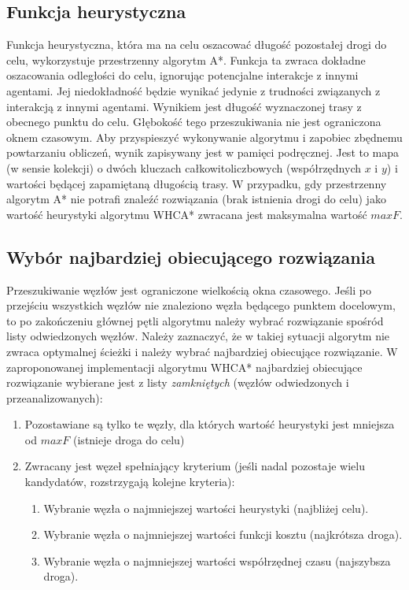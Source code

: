 \subsection{Funkcja heurystyczna}
Funkcja heurystyczna, która ma na celu oszacować długość pozostałej drogi do celu, wykorzystuje przestrzenny algorytm A*.
Funkcja ta zwraca dokładne oszacowania odległości do celu, ignorując potencjalne interakcje z innymi agentami. Jej niedokładność będzie wynikać jedynie z trudności związanych z interakcją z innymi agentami.
Wynikiem jest długość wyznaczonej trasy z obecnego punktu do celu.
Głębokość tego przeszukiwania nie jest ograniczona oknem czasowym.
Aby przyspieszyć wykonywanie algorytmu i zapobiec zbędnemu powtarzaniu obliczeń, wynik zapisywany jest w pamięci podręcznej.
Jest to mapa (w sensie kolekcji) o dwóch kluczach całkowitoliczbowych (współrzędnych $x$ i $y$) i wartości będącej zapamiętaną długością trasy.
W przypadku, gdy przestrzenny algorytm A* nie potrafi znaleźć rozwiązania (brak istnienia drogi do celu) jako wartość heurystyki algorytmu WHCA* zwracana jest maksymalna wartość $maxF$.

\subsection{Wybór najbardziej obiecującego rozwiązania}
Przeszukiwanie węzłów jest ograniczone wielkością okna czasowego. Jeśli po przejściu wszystkich węzłów nie znaleziono węzła będącego punktem docelowym, to po zakończeniu głównej pętli algorytmu należy wybrać rozwiązanie spośród listy odwiedzonych węzłów.
Należy zaznaczyć, że w takiej sytuacji algorytm nie zwraca optymalnej ścieżki i należy wybrać najbardziej obiecujące rozwiązanie.
W zaproponowanej implementacji algorytmu WHCA* najbardziej obiecujące rozwiązanie wybierane jest z listy {\it zamkniętych} (węzłów odwiedzonych i przeanalizowanych):
\begin{enumerate}
	\item Pozostawiane są tylko te węzły, dla których wartość heurystyki jest mniejsza od $maxF$ (istnieje droga do celu)
	\item Zwracany jest węzeł spełniający kryterium (jeśli nadal pozostaje wielu kandydatów, rozstrzygają kolejne kryteria):
	\begin{enumerate}
		\item Wybranie węzła o najmniejszej wartości heurystyki (najbliżej celu).
		\item Wybranie węzła o najmniejszej wartości funkcji kosztu (najkrótsza droga).
		\item Wybranie węzła o najmniejszej wartości współrzędnej czasu (najszybsza droga).
	\end{enumerate}
\end{enumerate}


